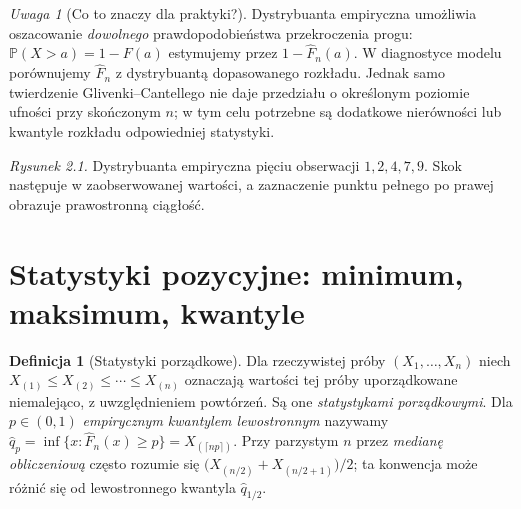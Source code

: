 \documentclass[11pt,a4paper,oneside]{report}
\numberwithin{equation}{chapter}
\theoremstyle{plain}
\theoremstyle{definition}
\newtheorem{definicja}{Definicja}[chapter]
\theoremstyle{remark}
\newtheorem{uwaga}{Uwaga}[chapter]
\newcommand{\Prob}{\mathbb P}
\begin{document}
\begin{uwaga}[Co to znaczy dla praktyki?]
Dystrybuanta empiryczna umożliwia oszacowanie \emph{dowolnego} prawdopodobieństwa przekroczenia progu: $\Prob(X>a)=1-F(a)$ estymujemy przez $1-\widehat F_n(a)$. W diagnostyce modelu porównujemy $\widehat F_n$ z dystrybuantą dopasowanego rozkładu. Jednak samo twierdzenie Glivenki--Cantellego nie daje przedziału o określonym poziomie ufności przy skończonym $n$; w tym celu potrzebne są dodatkowe nierówności lub kwantyle rozkładu odpowiedniej statystyki.
\end{uwaga}

\begin{center}
\end{center}
\noindent\emph{Rysunek 2.1.} Dystrybuanta empiryczna pięciu obserwacji $1,2,4,7,9$. Skok następuje w zaobserwowanej wartości, a zaznaczenie punktu pełnego po prawej obrazuje prawostronną ciągłość.

\section{Statystyki pozycyjne: minimum, maksimum, kwantyle}\label{sec:orderstats}
\begin{definicja}[Statystyki porządkowe]\label{def:order}
Dla rzeczywistej próby $(X_1,\ldots,X_n)$ niech $X_{(1)}\le X_{(2)}\le\cdots\le X_{(n)}$ oznaczają wartości tej próby uporządkowane niemalejąco, z uwzględnieniem powtórzeń. Są one \emph{statystykami porządkowymi}. Dla $p\in(0,1)$ \emph{empirycznym kwantylem lewostronnym} nazywamy $\widehat q_p=\inf\{x:\widehat F_n(x)\ge p\}=X_{(\lceil np\rceil)}$. Przy parzystym $n$ przez \emph{medianę obliczeniową} często rozumie się $\bigl(X_{(n/2)}+X_{(n/2+1)}\bigr)/2$; ta konwencja może różnić się od lewostronnego kwantyla $\widehat q_{1/2}$.
\end{definicja}
\end{document}
